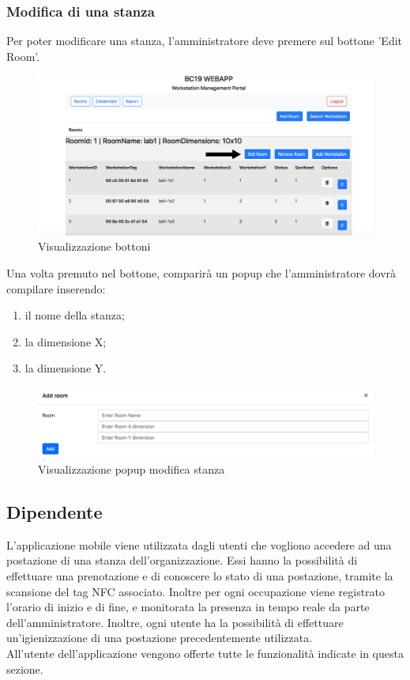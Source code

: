 \subsubsection{Modifica di una stanza}
Per poter modificare una stanza, l'amministratore deve premere sul bottone 'Edit Room'.
\begin{figure}[H]
	\centering
	\includegraphics[width=15cm]{res/images/bottoneEditRoom.png}
	\caption{Visualizzazione bottoni}
\end{figure}
Una volta premuto nel bottone, comparirà un popup che l'amministratore dovrà compilare inserendo:
\begin{enumerate}
\item il nome della stanza;
\item la dimensione X;
\item la dimensione Y.
\end{enumerate}
\begin{figure}[H]
	\centering
	\includegraphics[width=15cm]{res/images/aggiungiStanza1.png}
	\caption{Visualizzazione popup modifica stanza}
\end{figure}

\subsection{Dipendente}
L'applicazione mobile viene utilizzata dagli utenti che vogliono accedere ad una postazione di una stanza dell'organizzazione. Essi hanno la possibilità di effettuare una prenotazione e di conoscere lo stato di una postazione, tramite la scansione del tag NFC associato. Inoltre per ogni occupazione viene registrato l'orario di inizio e di fine, e monitorata la presenza in tempo reale da parte dell'amministratore. Inoltre, ogni utente ha la possibilità di effettuare un'igienizzazione di una postazione precedentemente utilizzata. 
\\All'utente dell'applicazione vengono offerte tutte le funzionalità indicate in questa sezione.
